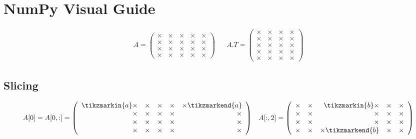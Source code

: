 \newpage

\section*{NumPy Visual Guide}

\begin{align*}
A = \left(\begin{array}{rrrrr}
\times & \times & \times & \times & \times\\
\times & \times & \times & \times & \times\\
\times & \times & \times & \times & \times\\
\times & \times & \times & \times & \times
\end{array}\right)
&&
A.T = \left(\begin{array}{rrrr}
\times & \times & \times & \times\\
\times & \times & \times & \times\\
\times & \times & \times & \times\\
\times & \times & \times & \times\\
\times & \times & \times & \times
\end{array}\right)
\end{align*}

\subsection*{Slicing}

\begin{align*}
A[0] = A[0,:] = \left(\begin{array}{rrrrr}
\tikzmarkin{a}\times & \times & \times & \times & \times\tikzmarkend{a}\\
\times & \times & \times & \times & \times\\
\times & \times & \times & \times & \times\\
\times & \times & \times & \times & \times\\
\end{array}\right)
&&
A[:,2] = \left(\begin{array}{rrrrr}
\times & \times & \tikzmarkin{b}\times & \times & \times\\
\times & \times & \times & \times & \times\\
\times & \times & \times & \times & \times\\
\times & \times & \times\tikzmarkend{b} & \times & \times
\end{array}\right)
\end{align*}

